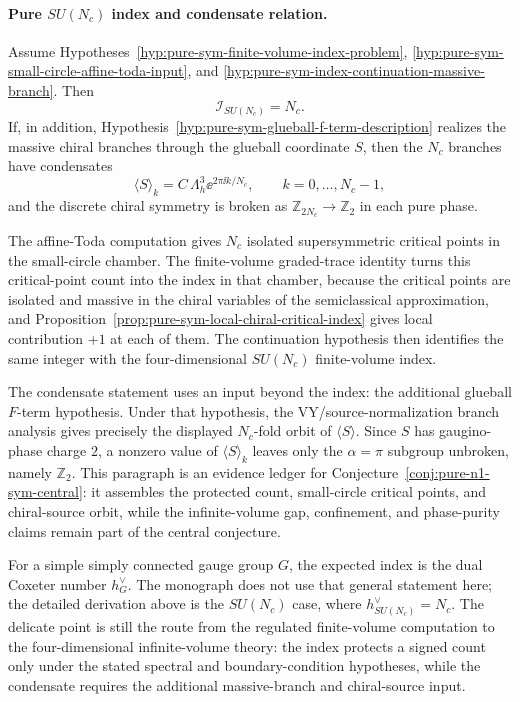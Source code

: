 \paragraph{Pure \(SU(N_c)\) index and condensate relation.}
Assume Hypotheses~\ref{hyp:pure-sym-finite-volume-index-problem},
\ref{hyp:pure-sym-small-circle-affine-toda-input}, and
\ref{hyp:pure-sym-index-continuation-massive-branch}.  Then
\[
  \mathcal I_{SU(N_c)}=N_c .
\]
If, in addition, Hypothesis~\ref{hyp:pure-sym-glueball-f-term-description}
realizes the massive chiral branches through the glueball coordinate \(S\),
then the \(N_c\) branches have condensates
\[
  \langle S\rangle_k
  =
  C\,\Lambda_h^3\ee^{2\pi\ii k/N_c},
  \qquad k=0,\ldots,N_c-1,
\]
and the discrete chiral symmetry is broken as
\(\mathbb Z_{2N_c}\to\mathbb Z_2\) in each pure phase.

The affine-Toda computation gives \(N_c\) isolated supersymmetric critical
points in the small-circle chamber.  The finite-volume graded-trace identity
turns this critical-point count into the index in that chamber, because the
critical points are isolated and massive in the chiral variables of the
semiclassical approximation, and
Proposition~\ref{prop:pure-sym-local-chiral-critical-index} gives local
contribution \(+1\) at each of them.  The continuation hypothesis then
identifies the same integer with the four-dimensional \(SU(N_c)\)
finite-volume index.

The condensate statement uses an input beyond the index: the additional
glueball \(F\)-term hypothesis.  Under that hypothesis,
the VY/source-normalization branch analysis gives precisely
the displayed \(N_c\)-fold orbit of \(\langle S\rangle\).  Since \(S\) has
gaugino-phase charge \(2\), a nonzero value of \(\langle S\rangle_k\) leaves
only the \(\alpha=\pi\) subgroup unbroken, namely \(\mathbb Z_2\).
This paragraph is an evidence ledger for
Conjecture~\ref{conj:pure-n1-sym-central}: it assembles the protected count,
small-circle critical points, and chiral-source orbit, while the infinite-volume
gap, confinement, and phase-purity claims remain part of the central
conjecture.

For a simple simply connected gauge group \(G\), the expected index is the
dual Coxeter number \(h^\vee_G\).  The monograph does not use that general
statement here; the detailed derivation above is the \(SU(N_c)\) case, where
\(h^\vee_{SU(N_c)}=N_c\).  The delicate point is still the route from the
regulated finite-volume computation to the four-dimensional infinite-volume
theory: the index protects a signed count only under the stated spectral and
boundary-condition hypotheses, while the condensate requires the additional
massive-branch and chiral-source input.


